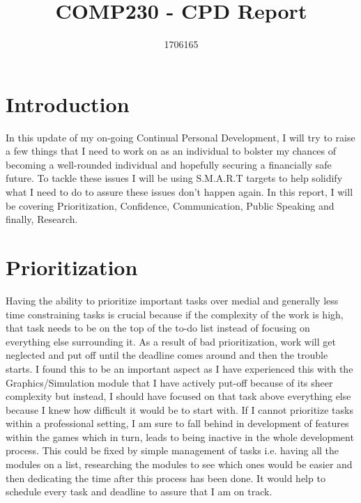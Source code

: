 \documentclass{scrartcl}
\title{COMP230 - CPD Report}
\author{1706165}
\begin{document}
\maketitle

\section{Introduction}
In this update of my on-going Continual Personal Development, I will try to raise a few things that I need to work on as an individual to bolster my chances of becoming a well-rounded individual and hopefully securing a financially safe future. To tackle these issues I will be using S.M.A.R.T targets to help solidify what I need to do to assure these issues don't happen again. In this report, I will be covering Prioritization, Confidence, Communication, Public Speaking and finally, Research.


\section{Prioritization}
Having the ability to prioritize important tasks over medial and generally less time constraining tasks is crucial because if the complexity of the work is high, that task needs to be on the top of the to-do list instead of focusing on everything else surrounding it. As a result of bad prioritization, work will get neglected and put off until the deadline comes around and then the trouble starts. I found this to be an important aspect as I have experienced this with the Graphics/Simulation module that I have actively put-off because of its sheer complexity but instead, I should have focused on that task above everything else because I knew how difficult it would be to start with. If I cannot prioritize tasks within a professional setting, I am sure to fall behind in development of features within the games which in turn, leads to being inactive in the whole development process. This could be fixed by simple management of tasks i.e. having all the modules on a list, researching the modules to see which ones would be easier and then dedicating the time after this process has been done. It would help to schedule every task and deadline to assure that I am on track.
\end{document}
